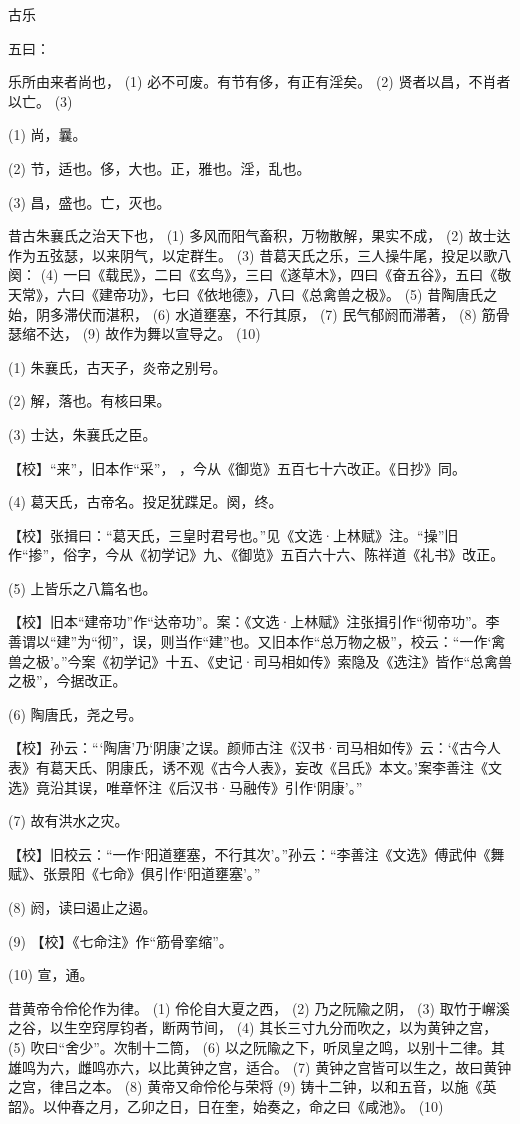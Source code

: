 \documentclass[12pt,UTF8]{ctexbook}
\begin{document}
古乐


五曰：

乐所由来者尚也， (1) 必不可废。有节有侈，有正有淫矣。 (2) 贤者以昌，不肖者以亡。 (3)

(1) 尚，曩。

(2) 节，适也。侈，大也。正，雅也。淫，乱也。

(3) 昌，盛也。亡，灭也。

昔古朱襄氏之治天下也， (1) 多风而阳气畜积，万物散解，果实不成， (2) 故士达作为五弦瑟，以来阴气，以定群生。 (3) 昔葛天氏之乐，三人操牛尾，投足以歌八阕： (4) 一曰《载民》，二曰《玄鸟》，三曰《遂草木》，四曰《奋五谷》，五曰《敬天常》，六曰《建帝功》，七曰《依地德》，八曰《总禽兽之极》。 (5) 昔陶唐氏之始，阴多滞伏而湛积， (6) 水道壅塞，不行其原， (7) 民气郁阏而滞著， (8) 筋骨瑟缩不达， (9) 故作为舞以宣导之。 (10)

(1) 朱襄氏，古天子，炎帝之别号。

(2) 解，落也。有核曰果。

(3) 士达，朱襄氏之臣。

【校】“来”，旧本作“采”， ，今从《御览》五百七十六改正。《日抄》同。

(4) 葛天氏，古帝名。投足犹蹀足。阕，终。

【校】张揖曰：“葛天氏，三皇时君号也。”见《文选·上林赋》注。“操”旧作“掺”，俗字，今从《初学记》九、《御览》五百六十六、陈祥道《礼书》改正。

(5) 上皆乐之八篇名也。

【校】旧本“建帝功”作“达帝功”。案：《文选·上林赋》注张揖引作“彻帝功”。李善谓以“建”为“彻”，误，则当作“建”也。又旧本作“总万物之极”，校云：“一作‘禽兽之极’。”今案《初学记》十五、《史记·司马相如传》索隐及《选注》皆作“总禽兽之极”，今据改正。

(6) 陶唐氏，尧之号。

【校】孙云：“‘陶唐’乃‘阴康’之误。颜师古注《汉书·司马相如传》云：‘《古今人表》有葛天氏、阴康氏，诱不观《古今人表》，妄改《吕氏》本文。’案李善注《文选》竟沿其误，唯章怀注《后汉书·马融传》引作‘阴康’。”

(7) 故有洪水之灾。

【校】旧校云：“一作‘阳道壅塞，不行其次’。”孙云：“李善注《文选》傅武仲《舞赋》、张景阳《七命》俱引作‘阳道壅塞’。”

(8) 阏，读曰遏止之遏。

(9) 【校】《七命注》作“筋骨挛缩”。

(10) 宣，通。

昔黄帝令伶伦作为律。 (1) 伶伦自大夏之西， (2) 乃之阮隃之阴， (3) 取竹于嶰溪之谷，以生空窍厚钧者，断两节间， (4) 其长三寸九分而吹之，以为黄钟之宫， (5) 吹曰“舍少”。次制十二筒， (6) 以之阮隃之下，听凤皇之鸣，以别十二律。其雄鸣为六，雌鸣亦六，以比黄钟之宫，适合。 (7) 黄钟之宫皆可以生之，故曰黄钟之宫，律吕之本。 (8) 黄帝又命伶伦与荣将 (9) 铸十二钟，以和五音，以施《英韶》。以仲春之月，乙卯之日，日在奎，始奏之，命之曰《咸池》。 (10)
\end{document}
